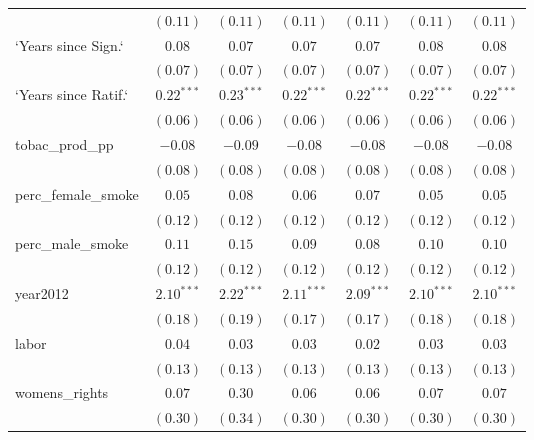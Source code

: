 \begin{table}[!h]
\begin{center}
\begin{tabular}{l c c c c c c }
                        & $(0.11)$     & $(0.11)$     & $(0.11)$     & $(0.11)$     & $(0.11)$     & $(0.11)$     \\
`Years since Sign.`     & $0.08$       & $0.07$       & $0.07$       & $0.07$       & $0.08$       & $0.08$       \\
                        & $(0.07)$     & $(0.07)$     & $(0.07)$     & $(0.07)$     & $(0.07)$     & $(0.07)$     \\
`Years since Ratif.`    & $0.22^{***}$ & $0.23^{***}$ & $0.22^{***}$ & $0.22^{***}$ & $0.22^{***}$ & $0.22^{***}$ \\
                        & $(0.06)$     & $(0.06)$     & $(0.06)$     & $(0.06)$     & $(0.06)$     & $(0.06)$     \\
tobac\_prod\_pp         & $-0.08$      & $-0.09$      & $-0.08$      & $-0.08$      & $-0.08$      & $-0.08$      \\
                        & $(0.08)$     & $(0.08)$     & $(0.08)$     & $(0.08)$     & $(0.08)$     & $(0.08)$     \\
perc\_female\_smoke     & $0.05$       & $0.08$       & $0.06$       & $0.07$       & $0.05$       & $0.05$       \\
                        & $(0.12)$     & $(0.12)$     & $(0.12)$     & $(0.12)$     & $(0.12)$     & $(0.12)$     \\
perc\_male\_smoke       & $0.11$       & $0.15$       & $0.09$       & $0.08$       & $0.10$       & $0.10$       \\
                        & $(0.12)$     & $(0.12)$     & $(0.12)$     & $(0.12)$     & $(0.12)$     & $(0.12)$     \\
year2012                & $2.10^{***}$ & $2.22^{***}$ & $2.11^{***}$ & $2.09^{***}$ & $2.10^{***}$ & $2.10^{***}$ \\
                        & $(0.18)$     & $(0.19)$     & $(0.17)$     & $(0.17)$     & $(0.18)$     & $(0.18)$     \\
labor                   & $0.04$       & $0.03$       & $0.03$       & $0.02$       & $0.03$       & $0.03$       \\
                        & $(0.13)$     & $(0.13)$     & $(0.13)$     & $(0.13)$     & $(0.13)$     & $(0.13)$     \\
womens\_rights          & $0.07$       & $0.30$       & $0.06$       & $0.06$       & $0.07$       & $0.07$       \\
                        & $(0.30)$     & $(0.34)$     & $(0.30)$     & $(0.30)$     & $(0.30)$     & $(0.30)$     \\

\end{tabular}
\end{center}
\end{table}
